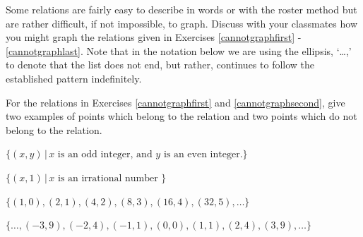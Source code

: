 \documentclass{ximera}
\begin{document}
\begin{question}
Some relations are fairly easy to describe in words or with the roster method but are rather difficult, if not impossible, to graph. Discuss with your classmates how you might graph the relations given in Exercises \ref{cannotgraphfirst} - \ref{cannotgraphlast}.  Note that in the notation below we are using the ellipsis, `\ldots,' to denote that the list does not end, but rather, continues to follow the established pattern indefinitely.  

For the relations in Exercises \ref{cannotgraphfirst} and \ref{cannotgraphsecond}, give two examples of points which belong to the relation and two points which do not belong to the relation.

\begin{problem} \label{cannotgraphfirst}
$\{(x, y) \, | \, x \mbox{ is an odd integer, and } y \mbox{ is an even integer.}\}$ 
\end{problem}

\begin{problem} \label{cannotgraphsecond}
$\{(x, 1) \, | \, x \mbox{ is an irrational number }\}$ 
\end{problem}

\begin{problem}
$\{(1, 0), (2, 1), (4, 2), (8, 3), (16, 4), (32, 5), \ldots \}$
\end{problem}

\begin{problem} \label{cannotgraphlast}
$\{\ldots, (-3, 9), (-2, 4), (-1, 1), (0, 0), (1, 1), (2, 4), (3, 9), \ldots \}$ 
\end{problem}

\end{question}
\end{document}
